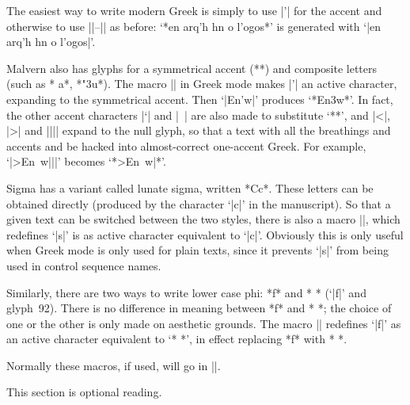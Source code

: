 
	The easiest way to write modern Greek is simply to use |'| for the
	accent and otherwise to use |\begingreek|--|\endgreek| as before:
	`*en arq'h hn o l'ogos*' is generated with `|en arq'h hn o l'ogos|'.

	Malvern also has glyphs for a symmetrical accent (**) and
	composite letters (such as * a*, *"\char3u*).  The macro
	|\monotoniko| in Greek mode makes |'| an active character,
	expanding to the symmetrical accent.  Then `|En'w|' produces
	`*En\char3w*'.  In fact, the other accent characters |`| and |~| are
	also made to substitute `**', and |<|, |>| and |||| expand to
	the null glyph, so that a text with all the breathings and accents
	and be hacked into almost-correct one-accent Greek.
	For example, `|>En~w|||' becomes `*\monotoniko >En~w|*'.


	Sigma has a variant called lunate sigma, written *Cc*.  These
	letters can be obtained directly (produced by the character `|c|' in
	the manuscript).  So that a given text can be switched between the
	two styles, there is also a macro |\grlunatesigma|, which redefines
	`|s|' is as active character equivalent to `|c|'.  Obviously this is
	only useful when Greek mode is only used for plain texts, since it
	prevents `|s|' from being used in control sequence names.

	Similarly, there are two ways to write lower case phi: *f* and
	* (`|f|' and glyph~92).  There is no difference in meaning
	between *f* and * *; the choice of one or the other is only
	made on aesthetic grounds.  The macro |\grvarphi| redefines `|f|' as
	an active character equivalent to `* *', in effect replacing
	*f* with * *.

	Normally these macros, if used, will go in |\everygreek|.
	
\iffalse

	This section is optional reading.


